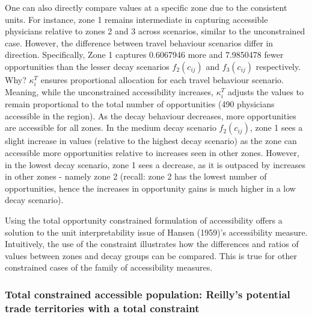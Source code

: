 \documentclass[
]{article}
\begin{document}
One can also directly compare values at a specific zone due to the
consistent units. For instance, zone 1 remains intermediate in capturing
accessible physicians relative to zones 2 and 3 across scenarios,
similar to the unconstrained case. However, the difference between
travel behaviour scenarios differ in direction. Specifically, Zone 1
captures 0.6067946 more and 7.9850478 fewer opportunities than the
lesser decay scenarios \(f_2(c_{ij})\) and \(f_3(c_{ij})\) respectively.
Why? \(\kappa_i^T\) ensures proportional allocation for each travel
behaviour scenario. Meaning, while the unconstrained accessibility
increases, \(\kappa_i^T\) adjusts the values to remain proportional to
the total number of opportunities (490 physicians accessible in the
region). As the decay behaviour decreases, more opportunities are
accessible for all zones. In the medium decay scenario \(f_2(c_{ij})\),
zone 1 sees a slight increase in values (relative to the highest decay
scenario) as the zone can accessible more opportunities relative to
increases seen in other zones. However, in the lowest decay scenario,
zone 1 sees a decrease, as it is outpaced by increases in other zones -
namely zone 2 (recall: zone 2 has the lowest number of opportunities,
hence the increases in opportunity gains is much higher in a low decay
scenario).

Using the total opportunity constrained formulation of accessibility
offers a solution to the unit interpretability issue of Hansen (1959)'s
accessibility measure. Intuitively, the use of the constraint
illustrates how the differences and ratios of values between zones and
decay groups can be compared. This is true for other constrained cases
of the family of accessibility measures.

\subsubsection{Total constrained accessible population: Reilly's
potential trade territories with a total
constraint}\label{total-constrained-accessible-population-reillys-potential-trade-territories-with-a-total-constraint}
\end{document}
